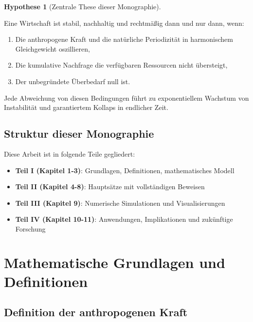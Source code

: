 \documentclass[a4paper,11pt]{report}
\theoremstyle{definition}
\newtheorem{hypothese}{Hypothese}[chapter]
\begin{document}
\begin{hypothese}[Zentrale These dieser Monographie]
    \label{hyp:zentral}
    
    Eine Wirtschaft ist stabil, nachhaltig und rechtmäßig dann und nur dann, wenn:
    
    \begin{enumerate}
        \item Die anthropogene Kraft und die natürliche Periodizität in harmonischem Gleichgewicht oszillieren,
        \item Die kumulative Nachfrage die verfügbaren Ressourcen nicht übersteigt,
        \item Der unbegründete Überbedarf null ist.
    \end{enumerate}
    
    Jede Abweichung von diesen Bedingungen führt zu exponentiellem Wachstum von Instabilität und garantiertem Kollaps in endlicher Zeit.
\end{hypothese}

\section{Struktur dieser Monographie}

Diese Arbeit ist in folgende Teile gegliedert:

\begin{itemize}
    \item \textbf{Teil I (Kapitel 1-3)}: Grundlagen, Definitionen, mathematisches Modell
    \item \textbf{Teil II (Kapitel 4-8)}: Hauptsätze mit vollständigen Beweisen
    \item \textbf{Teil III (Kapitel 9)}: Numerische Simulationen und Visualisierungen
    \item \textbf{Teil IV (Kapitel 10-11)}: Anwendungen, Implikationen und zukünftige Forschung
\end{itemize}

\chapter{Mathematische Grundlagen und Definitionen}

\section{Definition der anthropogenen Kraft}
\end{document}
